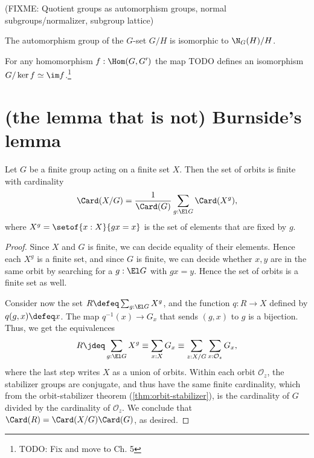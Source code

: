 (FIXME: Quotient groups as automorphism groups, normal subgroups/normalizer, subgroup lattice)

\begin{lemma}
  \label{lem:aut-orbit}
  The automorphism group of the $G$-set $G/H$ is isomorphic to $\N_G(H)/H$.
\end{lemma}

\begin{theorem}
  \label{thm:fund-thm-homs}
  For any homomorphism $f : \Hom(G,G')$
  the map {\color{blue} TODO} defines an isomorphism
  $G/\ker f \simeq \im f$.\footnote{TODO: Fix and move to Ch. 5}
\end{theorem}

\section{(the lemma that is not) Burnside's lemma}
\label{sec:burnsides-lemma}
\label{lem:burnsides-lemma}

\begin{lemma}
  \label{lem:burnside}
  Let $G$ be a finite group acting on a finite set $X$.
  Then the set of orbits is finite with cardinality
  \[
    \Card(X/G) = \frac1{\Card(G)}\sum_{g:\El G}\Card(X^g),
  \]
  where $X^g = \setof{x:X}{gx=x}$ is the set of elements
  that are fixed by $g$.
\end{lemma}
\begin{proof}
  Since $X$ and $G$ is finite, we can decide equality of their elements.
  Hence each $X^g$ is a finite set, and since $G$ is finite,
  we can decide whether $x,y$ are in the same orbit by searching
  for a $g : \El G$ with $gx = y$.
  Hence the set of orbits is a finite set as well.

  Consider now the set $R \defeq \sum_{g:\El G} X^g$,
  and the function $q : R \to X$
  defined by $q(g,x) \defeq x$.
  The map $q^{-1}(x) \to G_x$ that sends $(g,x)$ to $g$ is a bijection.
  Thus, we get the equivalences
  \[
    R \jdeq \sum_{g:\El G} X^g \equiv \sum_{x:X} G_x
    \equiv \sum_{z:X/G} \sum_{x : \mathcal O_z} G_x,
  \]
  where the last step writes $X$ as a union of orbits.
  Within each orbit $\mathcal O_z$,
  the stabilizer groups are conjugate,
  and thus have the same finite cardinality,
  which from the orbit-stabilizer theorem (\cref{thm:orbit-stabilizer}),
  is the cardinality of $G$ divided by the cardinality of $\mathcal O_z$.
  We conclude that $\Card(R) = \Card(X/G)\Card(G)$, as desired.
\end{proof}


